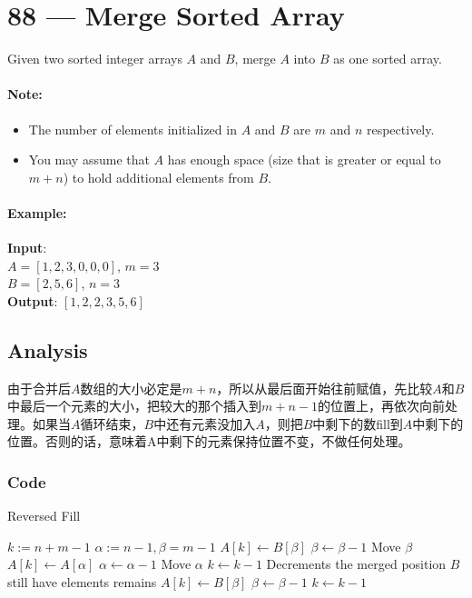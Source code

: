 \section{88 --- Merge Sorted Array}
Given two sorted integer arrays $A$ and $B$, merge $A$ into $B$ as one sorted array.
\paragraph{Note:}
\begin{itemize}
    \item The number of elements initialized in $A$ and $B$ are $m$ and $n$ respectively.
    \item You may assume that $A$ has enough space (size that is greater or equal to $m + n$) to hold additional elements from $B$.
\end{itemize}
\paragraph{Example:}
\begin{flushleft}
\textbf{Input}:
\\
$A = [1,2,3,0,0,0]$, $m = 3$
\\
$B = [2,5,6]$, $n = 3$
\\
\textbf{Output}: $[1,2,2,3,5,6]$
\end{flushleft}
\subsection{Analysis}
\begin{CJK*}{UTF8}{gbsn}
由于合并后$A$数组的大小必定是$m+n$，所以从最后面开始往前赋值，先比较$A$和$B$中最后一个元素的大小，把较大的那个插入到$m+n-1$的位置上，再依次向前处理。如果当$A$循环结束，$B$中还有元素没加入$A$，则把$B$中剩下的数fill到$A$中剩下的位置。否则的话，意味着A中剩下的元素保持位置不变，不做任何处理。
\end{CJK*}
\subsubsection{Code}
\setcounter{algorithm}{0}
\begin{algorithm}[H]
\caption{Reversed Fill}
\begin{algorithmic}[1]
\State $k:=n+m-1$
\State $\alpha:=n-1, \beta=m-1$
\State $A[k]\gets B[\beta]$
\State $\beta\gets \beta-1$ \Comment Move $\beta$ 
\Else
\State $A[k]\gets A[\alpha]$
\State $\alpha\gets \alpha-1$ \Comment Move $\alpha$ 
\EndIf
\State $k\gets k-1$ \Comment Decrements the merged position
\EndWhile
{} \Comment $B$ still have elements remains
\State $A[k]\gets B[\beta]$
\State $\beta\gets \beta-1$
\State $k\gets k-1$
\EndWhile
\EndProcedure
\end{algorithmic}
\end{algorithm}